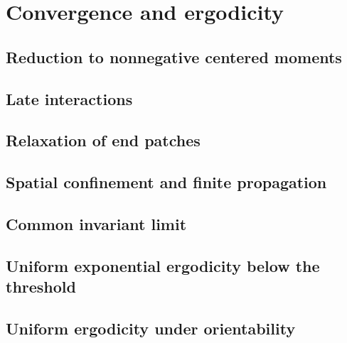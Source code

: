\section{Convergence and ergodicity}
\label{sec:convergence}

\subsection{Reduction to nonnegative centered moments}

\subsection{Late interactions}

\subsection{Relaxation of end patches}

\subsection{Spatial confinement and finite propagation}

\subsection{Common invariant limit}

\subsection{Uniform exponential ergodicity below the threshold}

\subsection{Uniform ergodicity under orientability}
\label{subsec:oriented-ergodicity}

